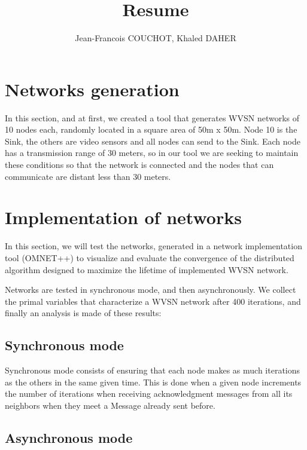 \documentclass[12pt,a4]{article}
\begin{document}
\title{Resume}
\author{Jean-Francois COUCHOT, Khaled DAHER}
\maketitle

\section{Networks generation}

\hspace{0.6cm}In this section, and at first, we created a tool that generates WVSN networks of 10 nodes each, randomly located in a square area of 50m x 50m. Node 10 is the Sink, the others are video sensors and all nodes can send to the Sink. Each node has a transmission range of 30 meters, so in our tool we are  seeking to maintain these conditions so that the network is connected and the nodes that can communicate are distant less than 30 meters. 

\section{Implementation of networks}

\hspace{0.6cm}In this section, we will test the networks, generated in a network implementation tool (OMNET++) to visualize and evaluate the convergence of the distributed algorithm designed to maximize the lifetime of implemented WVSN network.

Networks are tested in synchronous mode, and then asynchronously. We collect the primal variables that characterize a WVSN network after 400 iterations, and finally an analysis is made of these results:

\subsection{Synchronous mode }

\hspace{0.6cm}Synchronous mode consists of ensuring that each node makes as much iterations as the others in the same given time.  This is done when a given node increments the number of iterations when receiving acknowledgment messages from all its neighbors when they meet a Message already sent before.

\subsection{Asynchronous mode}
\end{document}
